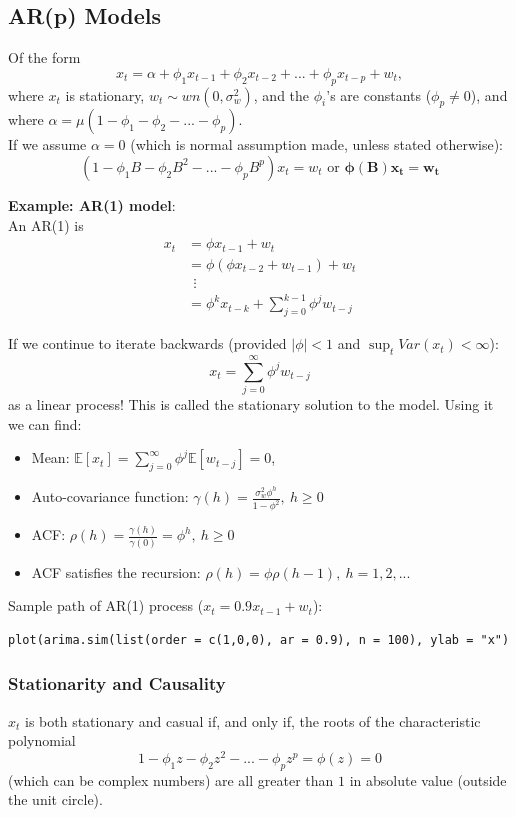 \documentclass[11pt]{article}
\newcommand{\noi}{\noindent}
\begin{document}
\subsection{AR(p) Models}
\noi Of the form
$$x_t = \alpha + \phi_1x_{t-1} + \phi_2x_{t-2} + ... + \phi_px_{t-p} + w_t,$$
\noi where $x_t$ is stationary, $w_t \sim wn(0, \sigma_w^2)$, and the $\phi_i$'s are constants ($\phi_p \neq 0$), and where $\alpha = \mu(1 - \phi_1 - \phi_2 - ... - \phi_p)$. \\

\noi If we assume $\alpha = 0$ (which is normal assumption made, unless stated otherwise):
$$(1 - \phi_1B - \phi_2B^2 - ... - \phi_pB^p)x_t = w_t \text{ or } \boldsymbol{\phi(B)x_t = w_t}$$

\noi \textbf{Example: AR(1) model}: \\
\noi An AR(1) is
\begin{align*}
    x_t &= \phi x_{t-1} + w_t \\
    &= \phi(\phi x_{t-2} + w_{t-1}) + w_t \\
    & \ \ \vdots \\
    &= \phi^k x_{t-k} + \sum_{j=0}^{k-1}{\phi^j w_{t-j}}
\end{align*} \phantom{i}

\noi If we continue to iterate backwards (provided $|\phi| < 1$ and $\sup_tVar(x_t) < \infty$):
$$x_t = \sum_{j=0}^{\infty}{\phi^j w_{t-j}}$$
\noi as a linear process! This is called the stationary solution to the model. Using it we can find:
\begin{itemize}
    \item Mean: $\mathbb{E}[x_t] = \sum_{j=0}^{\infty}\phi^j\mathbb{E}[w_{t-j}] = 0$,
    \item Auto-covariance function: $\gamma(h) = \frac{\sigma_w^2 \phi^h}{1 - \phi^2}, \: h \geq 0$
    \item ACF: $\rho(h) = \frac{\gamma(h)}{\gamma(0)} = \phi^h, \: h \geq 0$
    \item ACF satisfies the recursion: $\rho(h) = \phi \rho(h-1), \: h=1,2,...$
\end{itemize} \phantom{i}

\noi Sample path of AR(1) process ($x_t = 0.9x_{t-1} + w_t$):
\begin{lstlisting}
plot(arima.sim(list(order = c(1,0,0), ar = 0.9), n = 100), ylab = "x")
\end{lstlisting}

\subsubsection{Stationarity and Causality}
\noi $x_t$ is both stationary and casual if, and only if, the roots of the characteristic polynomial
$$1 - \phi_1z - \phi_2z^2 - ... - \phi_pz^p = \phi(z) = 0$$
\noi (which can be complex numbers) are all greater than $1$ in absolute value (outside the unit circle).
\end{document}

